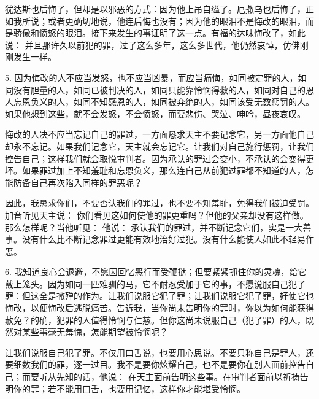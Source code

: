 犹达斯也后悔了，但却是以邪恶的方式：因为他上吊自缢了。厄撒乌也后悔了，正如我所说；或者更确切地说，他连后悔也没有；因为他的眼泪不是悔改的眼泪，而是骄傲和愤怒的眼泪。接下来发生的事证明了这一点。有福的达味悔改了，如此说： 并且那许久以前犯的罪，过了这么多年，这么多世代，他仍然哀悼，仿佛刚刚发生一样。\par

5. 因为悔改的人不应当发怒，也不应当凶暴，而应当痛悔，如同被定罪的人，如同没有胆量的人，如同已被判决的人，如同只能靠怜悯得救的人，如同对自己的恩人忘恩负义的人，如同不知感恩的人，如同被弃绝的人，如同该受无数惩罚的人。如果他想到这些，就不会发怒，不会愤怒，而要悲伤、哭泣、呻吟，昼夜哀叹。\par

悔改的人决不应当忘记自己的罪过，一方面恳求天主不要记念它，另一方面他自己却永不忘记。如果我们记念它，天主就会忘记它。让我们对自己施行惩罚，让我们控告自己；这样我们就会取悦审判者。因为承认的罪过会变小，不承认的会变得更坏。如果罪过加上不知羞耻和忘恩负义，那么连自己从前犯过罪都不知道的人，怎能防备自己再次陷入同样的罪恶呢？\par

因此，我恳求你们，不要否认我们的罪过，也不要不知羞耻，免得我们被迫受罚。加音听见天主说： 你们看见这如何使他的罪更重吗？但他的父亲却没有这样做。那么怎样呢？当他听见： 他说： 承认我们的罪过，并不断记念它们，实是一大善事。没有什么比不断记念罪过更能有效地治好过犯。没有什么能使人如此不轻易作恶。\par

6. 我知道良心会退避，不愿因回忆恶行而受鞭挞；但要紧紧抓住你的灵魂，给它戴上笼头。因为如同一匹难驯的马，它不耐忍受加于它的事，不愿说服自己犯了罪：但这全是撒殚的作为。让我们说服它犯了罪；让我们说服它犯了罪，好使它也悔改，以便悔改后逃脱痛苦。告诉我，当你尚未告明你的罪时，你以为如何能获得赦免？的确，犯罪的人值得怜悯与仁慈。但你这尚未说服自己（犯了罪）的人，既然对某些事毫无羞愧，怎能期望被怜悯呢？\par

让我们说服自己犯了罪。不仅用口舌说，也要用心思说。不要只称自己是罪人，还要细数我们的罪，逐一过目。我不是要你炫耀自己，也不是要你在别人面前控告自己；而要听从先知的话，他说：  在天主面前告明这些事。在审判者面前以祈祷告明你的罪；若不能用口舌，也要用记忆，这样你才能堪受怜悯。\par

